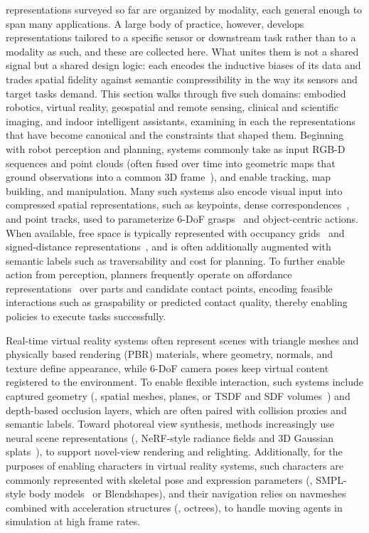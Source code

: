  representations surveyed so far are organized by modality, each general enough to span many applications. 
A large body of practice, however, develops representations tailored to a specific sensor or downstream task rather than to a modality as such, and these are collected here. 
What unites them is not a shared signal but a shared design logic: each encodes the inductive biases of its data and trades spatial fidelity against semantic compressibility in the way its sensors and target tasks demand. 
This section walks through five such domains: embodied robotics, virtual reality, geospatial and remote sensing, clinical and scientific imaging, and indoor intelligent assistants, examining in each the representations that have become canonical and the constraints that shaped them. 
Beginning with robot perception and planning, systems commonly take as input RGB-D sequences and point clouds (often fused over time into geometric maps that ground observations into a common 3D frame~\cite{newcombe2011kinectfusion, dai2017bundlefusion}), and enable tracking, map building, and manipulation. 
Many such systems also encode visual input into compressed spatial representations, such as keypoints, dense correspondences~\cite{florencemanuelli2018dense}, and point tracks, used to parameterize 6-DoF grasps~\cite{mousavian20196} and object-centric actions.
When available, free space is typically represented with occupancy grids~\cite{Moravec1985SonarMaps, hornung2013octomap} and signed-distance representations~\cite{curless1996volumetric}, and is often additionally augmented with semantic labels such as traversability and cost for planning. 
To further enable action from perception, planners frequently operate on affordance representations~\cite{mo2021where2act} over parts and candidate contact points, encoding feasible interactions such as graspability or predicted contact quality, thereby enabling policies to execute tasks successfully.

Real-time virtual reality systems often represent scenes with triangle meshes and physically based rendering (PBR) materials, where geometry, normals, and texture define appearance, while 6-DoF camera poses keep virtual content registered to the environment. 
To enable flexible interaction, such systems include captured geometry (\eg, spatial meshes, planes, or TSDF and SDF volumes~\cite{curless1996volumetric, newcombe2011kinectfusion}) and depth-based occlusion layers, which are often paired with collision proxies and semantic labels. 
Toward photoreal view synthesis, methods increasingly use neural scene representations (\eg, NeRF-style radiance fields and 3D Gaussian splats~\cite{mildenhall2021nerf, kerbl20233d}), to support novel-view rendering and relighting. 
Additionally, for the purposes of enabling characters in virtual reality systems, such characters are commonly represented with skeletal pose and expression parameters (\eg, SMPL-style body models~\cite{loper2015smpl} or Blendshapes), and their navigation relies on navmeshes combined with acceleration structures (\eg, octrees), to handle moving agents in simulation at high frame rates.

